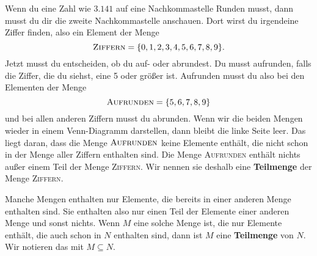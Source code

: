 \documentclass[../../main.tex]{subfiles}
\begin{document}
\begin{example}{}

    Wenn du eine Zahl wie $3.141$ auf eine Nachkommastelle Runden musst, dann musst du dir die zweite Nachkommastelle anschauen. Dort wirst du irgendeine Ziffer finden, also ein Element der Menge
    \[\textsc{Ziffern}=\{0,1,2,3,4,5,6,7,8,9\}.\]
    Jetzt musst du entscheiden, ob du auf- oder abrundest. Du musst aufrunden, falls die Ziffer, die du siehst, eine 5 oder größer ist. Aufrunden musst  du also bei den Elementen der Menge
    \[\textsc{Aufrunden}=\{5,6,7,8,9\}\]
    und bei allen anderen Ziffern musst du abrunden. Wenn wir die beiden Mengen wieder in einem Venn-Diagramm darstellen, dann bleibt die linke Seite leer. Das liegt daran, dass die Menge $\textsc{Aufrunden}$ keine Elemente enthält, die nicht schon in der Menge aller Ziffern enthalten sind. Die Menge \textsc{Aufrunden} enthält nichts außer einem Teil der Menge \textsc{Ziffern}. Wir nennen sie deshalb eine \textbf{Teilmenge} der Menge \textsc{Ziffern}.
\end{example}

Manche Mengen enthalten nur Elemente, die bereits in einer anderen Menge enthalten sind. Sie enthalten also nur einen Teil der Elemente einer anderen Menge und sonst nichts. Wenn $M$ eine solche Menge ist, die nur Elemente enthält, die auch schon in $N$ enthalten sind, dann ist $M$ eine \textbf{Teilmenge} von $N$. Wir notieren das mit $M\subseteq N$. 
\end{document}
